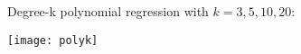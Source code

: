 \begin{answer}

  \graphicspath{ {./featuremaps/} }

Degree-k polynomial regression with $k=3,5,10,20$:

\texttt{[image: polyk]}


\end{answer}
